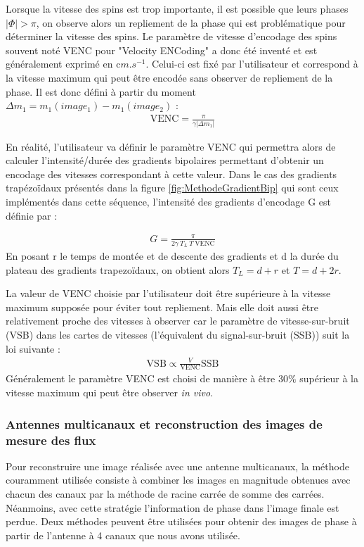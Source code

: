 Lorsque la vitesse des spins est trop importante, il est possible que leurs phases $| \Phi | > \pi$, on observe alors un repliement de la phase qui est problématique pour déterminer la vitesse des spins. Le paramètre de vitesse d'encodage des spins souvent noté VENC pour "Velocity ENCoding" a donc été inventé et est généralement exprimé en c$m.s^{-1}$. Celui-ci est fixé par l'utilisateur et correspond à la vitesse maximum qui peut être encodée sans observer de repliement de la phase. Il est donc défini à partir du moment $\Delta m_1=m_1(image_1)-m_1(image_2)$ :
\begin{align}
\text{VENC} = \frac{\pi}{\gamma | \Delta m_1 |}
\end{align} 

En réalité, l'utilisateur va définir le paramètre VENC qui permettra alors de calculer l'intensité/durée des gradients bipolaires permettant d'obtenir un encodage des vitesses correspondant à cette valeur. Dans le cas des gradients trapézoïdaux présentés dans la figure \ref{fig:MethodeGradientBip} qui sont ceux implémentés dans cette séquence, l'intensité des gradients d'encodage G est définie par :

\begin{align}
G = \frac{\pi}{2 \gamma \ T_L \ T \ \text{VENC}}
\end{align}
En posant r le temps de montée et de descente des gradients et d la durée du plateau des gradients trapezoïdaux, on obtient alors $T_L = d+r$ et $T = d+2r$.

La valeur de VENC choisie par l'utilisateur doit être supérieure à la vitesse maximum supposée pour éviter tout repliement. Mais elle doit aussi être relativement proche des vitesses à observer car le paramètre de vitesse-sur-bruit (VSB) dans les cartes de vitesses (l'équivalent du signal-sur-bruit (SSB)) suit la loi suivante :
\begin{align}
\text{VSB} \propto \frac{V}{\text{VENC}}\text{SSB}
\end{align}
 Généralement le paramètre VENC est choisi de manière à être 30$\%$ supérieur à la vitesse maximum qui peut être observer \textit{in vivo}. 

\subsubsection{Antennes multicanaux et reconstruction des images de mesure des flux}

Pour reconstruire une image réalisée avec une antenne multicanaux, la méthode couramment utilisée consiste à combiner les images en magnitude obtenues avec chacun des canaux par la méthode de racine carrée de somme des carrées. Néanmoins, avec cette stratégie l’information de phase dans l’image finale est perdue.
Deux méthodes peuvent être utilisées pour obtenir des images de phase à partir de l’antenne à 4 canaux que nous avons utilisée.

